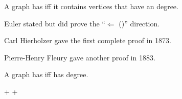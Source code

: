 \begin{frame}{}
  \begin{theorem}
    A  graph has  iff
    it contains  vertices that have an  degree.
  \end{theorem}

  \pause
  \vspace{0.60cm}
  \begin{center}
    Euler stated but did 
    prove the ``$\Longleftarrow$ ({\it {}})'' direction.

    \pause
    \vspace{0.60cm}
    Carl Hierholzer  gave the first complete proof in 1873.

    \pause
    \vspace{0.60cm}
    Pierre-Henry Fleury gave another proof in 1883.
  \end{center}
\end{frame}

\begin{frame}{}
  \begin{theorem}
    A  graph has  iff
     has  degree.
    \begin{center}
    \end{center}
  \end{theorem}

  \pause
  \vspace{0.30cm}
  \begin{center}
     +  + 
  \end{center}
\end{frame}


